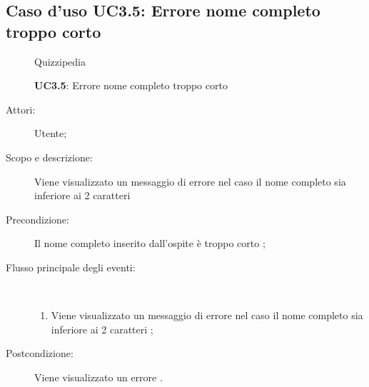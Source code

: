 \subsection{Caso d'uso UC3.5: Errore nome completo troppo corto}
	\begin{figure}[H]
		\centering
		\begin{resizedtikzpicture}{\textwidth}
		\begin{umlsystem}[x=0, fill=lightgray!20]{Quizzipedia}
		\end{umlsystem}
		\end{resizedtikzpicture}
		\caption{\textbf{UC3.5}: Errore nome completo troppo corto}
		\label{UC3.5}
	\end{figure}
\begin{description}
\item[Attori:] Utente;
\item[Scopo e descrizione:] Viene visualizzato un messaggio di errore nel caso il nome completo sia inferiore ai 2 caratteri

      \item[Precondizione:] Il nome completo inserito dall'ospite è troppo corto
;

        \item[Flusso principale degli eventi:] \ 
 \begin{enumerate}
          \item Viene visualizzato un messaggio di errore nel caso il nome completo sia inferiore ai 2 caratteri	;

      \end{enumerate}
    \item[Postcondizione:] Viene visualizzato un errore
.
  \end{description}
\hypertarget{UC3.6}{}
